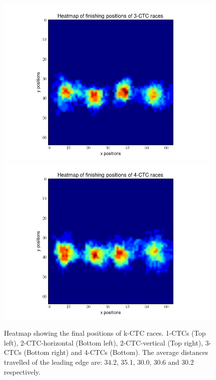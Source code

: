 \documentclass[12pt]{article}
\begin{document}
\begin{figure}[h]
	\includegraphics[scale=0.40]{img/3CTC-final}
	\includegraphics[scale=0.40]{img/4CTC-final}
	\caption{Heatmap showing the final positions of k-CTC races. 1-CTCs (Top left), 2-CTC-horizontal (Bottom left), 2-CTC-vertical (Top right), 3-CTCs (Bottom right) and 4-CTCs (Bottom). The average distances travelled of the leading edge are: 34.2, 35.1, 30.0, 30.6 and 30.2 respectively. }
	\label{race_end}
\end{figure}

\pagebreak



\end{document}
